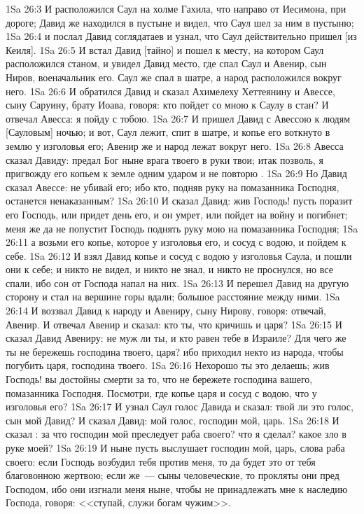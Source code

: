 \vs 1Sa 26:3 И расположился Саул на холме Гахила, что направо от Иесимона, при дороге; Давид же находился в пустыне и видел, что Саул шел за ним в пустыню;
\vs 1Sa 26:4 и послал Давид соглядатаев и узнал, что Саул действительно пришел [из Кеиля].
\vs 1Sa 26:5 И встал Давид [тайно] и пошел к месту, на котором Саул расположился станом, и увидел Давид место, где спал Саул и Авенир, сын Ниров, военачальник его. Саул же спал в шатре, а народ расположился вокруг него.
\vs 1Sa 26:6 И обратился Давид и сказал Ахимелеху Хеттеянину и Авессе, сыну Саруину, брату Иоава, говоря: кто пойдет со мною к Саулу в стан? И отвечал Авесса: я пойду с тобою.
\vs 1Sa 26:7 И пришел Давид с Авессою к людям [Сауловым] ночью; и вот, Саул лежит, спит в шатре, и копье его воткнуто в землю у изголовья его; Авенир же и народ лежат вокруг него.
\vs 1Sa 26:8 Авесса сказал Давиду: предал Бог ныне врага твоего в руки твои; итак позволь, я пригвожду его копьем к земле одним ударом и не повторю .
\vs 1Sa 26:9 Но Давид сказал Авессе: не убивай его; ибо кто, подняв руку на помазанника Господня, останется ненаказанным?
\vs 1Sa 26:10 И сказал Давид: жив Господь! пусть поразит его Господь, или придет день его, и он умрет, или пойдет на войну и погибнет; меня же да не попустит Господь поднять руку мою на помазанника Господня;
\vs 1Sa 26:11 а возьми его копье, которое у изголовья его, и сосуд с водою, и пойдем к себе.
\vs 1Sa 26:12 И взял Давид копье и сосуд с водою у изголовья Саула, и пошли они к себе; и никто не видел, и никто не знал, и никто не проснулся, но все спали, ибо сон от Господа напал на них.
\vs 1Sa 26:13 И перешел Давид на другую сторону и стал на вершине горы вдали; большое расстояние  между ними.
\vs 1Sa 26:14 И воззвал Давид к народу и Авениру, сыну Нирову, говоря: отвечай, Авенир. И отвечал Авенир и сказал: кто ты, что кричишь и  царя?
\vs 1Sa 26:15 И сказал Давид Авениру: не муж ли ты, и кто равен тебе в Израиле? Для чего же ты не бережешь господина твоего, царя? ибо приходил некто из народа, чтобы погубить царя, господина твоего.
\vs 1Sa 26:16 Нехорошо ты это делаешь; жив Господь! вы достойны смерти за то, что не бережете господина вашего, помазанника Господня. Посмотри, где копье царя и сосуд с водою, что  у изголовья его?
\vs 1Sa 26:17 И узнал Саул голос Давида и сказал: твой ли это голос, сын мой Давид? И сказал Давид: мой голос, господин мой, царь.
\vs 1Sa 26:18 И сказал : за что господин мой преследует раба своего? что я сделал? какое зло в руке моей?
\vs 1Sa 26:19 И ныне пусть выслушает господин мой, царь, слова раба своего: если Господь возбудил тебя против меня, то да будет это от тебя благовонною жертвою; если же~--- сыны человеческие, то прокляты они пред Господом, ибо они изгнали меня ныне, чтобы не принадлежать мне к наследию Господа, говоря: <<ступай, служи богам чужим>>.
